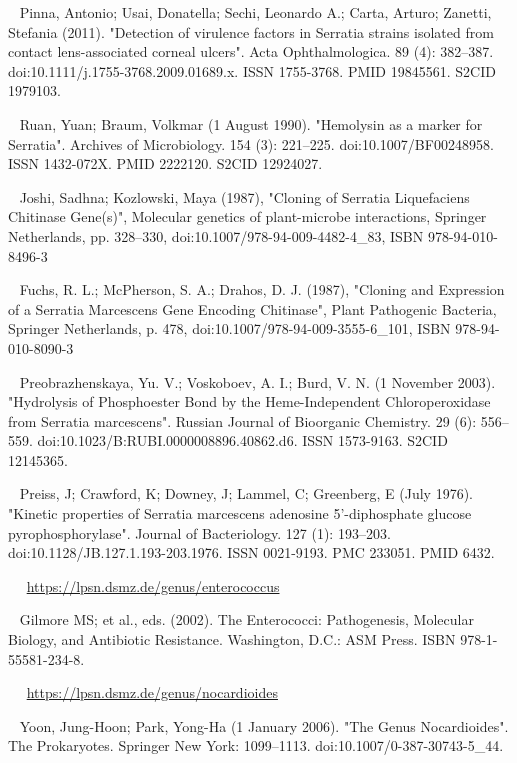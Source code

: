 \documentclass[11pt]{article}
\begin{document}
\begin{thebibliography}{3}
	~ Pinna, Antonio; Usai, Donatella; Sechi, Leonardo A.; Carta, Arturo; Zanetti, Stefania (2011). "Detection of virulence factors in Serratia strains isolated from contact lens-associated corneal ulcers". Acta Ophthalmologica. 89 (4): 382–387. doi:10.1111/j.1755-3768.2009.01689.x. ISSN 1755-3768. PMID 19845561. S2CID 1979103.
	
	~ Ruan, Yuan; Braum, Volkmar (1 August 1990). "Hemolysin as a marker for Serratia". Archives of Microbiology. 154 (3): 221–225. doi:10.1007/BF00248958. ISSN 1432-072X. PMID 2222120. S2CID 12924027.
	
	~ Joshi, Sadhna; Kozlowski, Maya (1987), "Cloning of Serratia Liquefaciens Chitinase Gene(s)", Molecular genetics of plant-microbe interactions, Springer Netherlands, pp. 328–330, doi:10.1007/978-94-009-4482-4\_83, ISBN 978-94-010-8496-3
	
	~ Fuchs, R. L.; McPherson, S. A.; Drahos, D. J. (1987), "Cloning and Expression of a Serratia Marcescens Gene Encoding Chitinase", Plant Pathogenic Bacteria, Springer Netherlands, p. 478, doi:10.1007/978-94-009-3555-6\_101, ISBN 978-94-010-8090-3
	
	~ Preobrazhenskaya, Yu. V.; Voskoboev, A. I.; Burd, V. N. (1 November 2003). "Hydrolysis of Phosphoester Bond by the Heme-Independent Chloroperoxidase from Serratia marcescens". Russian Journal of Bioorganic Chemistry. 29 (6): 556–559. doi:10.1023/B:RUBI.0000008896.40862.d6. ISSN 1573-9163. S2CID 12145365.
	
	~ Preiss, J; Crawford, K; Downey, J; Lammel, C; Greenberg, E (July 1976). "Kinetic properties of Serratia marcescens adenosine 5'-diphosphate glucose pyrophosphorylase". Journal of Bacteriology. 127 (1): 193–203. doi:10.1128/JB.127.1.193-203.1976. ISSN 0021-9193. PMC 233051. PMID 6432.
	
	~ ~\url{https://lpsn.dsmz.de/genus/enterococcus}
	
	~ Gilmore MS; et al., eds. (2002). The Enterococci: Pathogenesis, Molecular Biology, and Antibiotic Resistance. Washington, D.C.: ASM Press. ISBN 978-1-55581-234-8.
	
	~ ~\url{https://lpsn.dsmz.de/genus/nocardioides}
	
	~  Yoon, Jung-Hoon; Park, Yong-Ha (1 January 2006). "The Genus Nocardioides". The Prokaryotes. Springer New York: 1099–1113. doi:10.1007/0-387-30743-5\_44.
	

\end{thebibliography}
\end{document}
